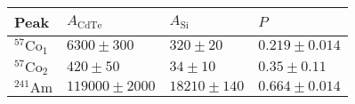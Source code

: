 	\begin{tabular}{|p{3cm}|p{3cm}|p{3cm}|p{3cm}|}
		\hline
		\rowcolor{tabcolor}
		Peak   & $A_\mathrm{CdTe}$ & $A_\mathrm{Si}$ & $P$\\ 
		\hline
		$^{57}\mathrm{Co}_1$ & $6300 \pm 300$ & $320 \pm 20$ & $0.219 \pm 0.014$\\ 
		$^{57}\mathrm{Co}_2$ & $420 \pm 50$ & $34 \pm 10$ & $0.35 \pm 0.11$\\ 
		$^{241}\mathrm{Am}$ & $119000 \pm 2000$ & $18210 \pm 140$ & $0.664 \pm 0.014$\\ 
		\hline
	\end{tabular}
